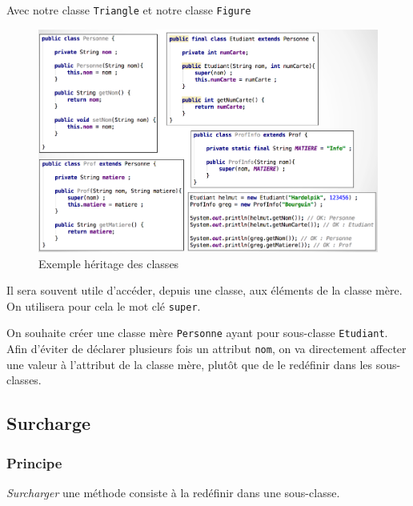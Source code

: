 			\begin{exemple}
				Avec notre classe \lstinline|Triangle| et notre classe \lstinline|Figure|
				
			\end{exemple}
		
			\begin{figure}[h]
				\centering
				\includegraphics[width=1.0\linewidth]{images/heritage}
				\caption{Exemple héritage des classes}
				\label{fig:heritage}
			\end{figure}
			
			Il sera souvent utile d'accéder, depuis une classe, aux éléments de la classe mère. On utilisera pour cela le mot clé \lstinline|super|.
			\begin{exemple}
				On souhaite créer une classe mère \lstinline|Personne| ayant pour sous-classe \lstinline|Etudiant|. Afin d'éviter de déclarer plusieurs fois un attribut \lstinline|nom|, on va directement affecter une valeur à l'attribut de la classe mère, plutôt que de le redéfinir dans les sous-classes. 
				
			\end{exemple}
							
		\subsection{Surcharge}
		
			\subsubsection{Principe}
			
				\begin{definition}
					\emph{Surcharger} une méthode consiste à la redéfinir dans une sous-classe.
				\end{definition}
			
